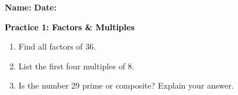 \documentclass[12pt, letterpaper, fleqn]{article}
\begin{document}
\textbf{Name:} \underline{\hspace{5cm}}
\hfill
\textbf{Date:} \underline{\hspace{3cm}}\\

\begin{tcolorbox}[colback=customteal!20]
    \large\textcolor{black}{\textbf{Practice 1: Factors \& Multiples}}
\end{tcolorbox}

\vspace{5mm}
\begin{enumerate}[itemsep=3.5cm, leftmargin=0.6cm]
\item Find all factors of 36.
\vspace{3.5cm}

\item List the first four multiples of 8.
\vspace{3.5cm}

\item Is the number 29 prime or composite? Explain your answer.
\end{enumerate}
\end{document}
